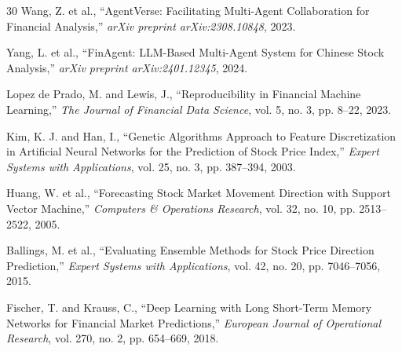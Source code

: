 \documentclass[12pt,a4paper]{report}
\begin{document}
\begin{thebibliography}{30}
Wang, Z. et al., ``AgentVerse: Facilitating Multi-Agent Collaboration for Financial Analysis,'' \textit{arXiv preprint arXiv:2308.10848}, 2023.

Yang, L. et al., ``FinAgent: LLM-Based Multi-Agent System for Chinese Stock Analysis,'' \textit{arXiv preprint arXiv:2401.12345}, 2024.

Lopez de Prado, M. and Lewis, J., ``Reproducibility in Financial Machine Learning,'' \textit{The Journal of Financial Data Science}, vol. 5, no. 3, pp. 8--22, 2023.

Kim, K. J. and Han, I., ``Genetic Algorithms Approach to Feature Discretization in Artificial Neural Networks for the Prediction of Stock Price Index,'' \textit{Expert Systems with Applications}, vol. 25, no. 3, pp. 387--394, 2003.

Huang, W. et al., ``Forecasting Stock Market Movement Direction with Support Vector Machine,'' \textit{Computers & Operations Research}, vol. 32, no. 10, pp. 2513--2522, 2005.

Ballings, M. et al., ``Evaluating Ensemble Methods for Stock Price Direction Prediction,'' \textit{Expert Systems with Applications}, vol. 42, no. 20, pp. 7046--7056, 2015.

Fischer, T. and Krauss, C., ``Deep Learning with Long Short-Term Memory Networks for Financial Market Predictions,'' \textit{European Journal of Operational Research}, vol. 270, no. 2, pp. 654--669, 2018.

\end{thebibliography}
\end{document}
